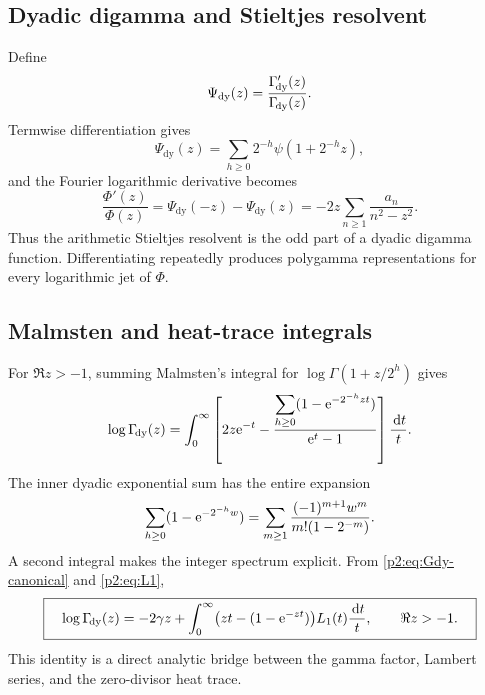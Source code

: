 \documentclass[11pt]{article}
\theoremstyle{definition}
\theoremstyle{remark}
\newcommand{\dd}{\,\mathrm d}
\begin{document}
\subsection{Dyadic digamma and Stieltjes resolvent}

Define
\begin{equation}
 \Psi_{\mathrm{dy}}(z)=\frac{\Gamma_{\!\mathrm{dy}}'(z)}{\Gamma_{\!\mathrm{dy}}(z)}.
\end{equation}
Termwise differentiation gives
\begin{equation}
 \Psi_{\mathrm{dy}}(z)=\sum_{h\ge0}2^{-h}\psi(1+2^{-h}z),                 \label{p2:eq:dyadic-digamma}
\end{equation}
and the Fourier logarithmic derivative becomes
\begin{equation}
 \boxed{\quad
 \frac{\Phi'(z)}{\Phi(z)}
 =\Psi_{\mathrm{dy}}(-z)-\Psi_{\mathrm{dy}}(z)
 =-2z\sum_{n\ge1}\frac{a_n}{n^2-z^2}.
 \quad}                                                  \label{p2:eq:digamma-resolvent}
\end{equation}
Thus the arithmetic Stieltjes resolvent is the odd part of a dyadic digamma function.
Differentiating repeatedly produces polygamma representations for every logarithmic jet of
$\Phi$.

\subsection{Malmsten and heat-trace integrals}

For $\Re z>-1$, summing Malmsten's integral for $\log\Gamma(1+z/2^h)$ gives
\begin{equation}
 \log\GammaDy(z)=\int_0^\infty
 \left[
 2z\e^{-t}-\frac{\displaystyle\sum_{h\ge0}
 (1-\e^{-2^{-h}zt})}{\e^t-1}
 \right]\frac{\dd t}{t}.                               \label{p2:eq:GammaDy-Malmsten}
\end{equation}
The inner dyadic exponential sum has the entire expansion
\begin{equation}
 \sum_{h\ge0}(1-\mathrm e^{-2^{-h}w})
 =\sum_{m\ge1}\frac{(-1)^{m+1}w^m}{m!(1-2^{-m})}.       \label{p2:eq:dyadic-exponential-sum}
\end{equation}
A second integral makes the integer spectrum explicit.  From
\eqref{p2:eq:Gdy-canonical} and \eqref{p2:eq:L1},
\begin{equation}
 \boxed{\quad
 \log\GammaDy(z)
 =-2\gamma z+\int_0^\infty
 \bigl(zt-(1-\e^{-zt})\bigr)L_1(t)\frac{\dd t}{t},
 \qquad \Re z>-1.
 \quad}                                                  \label{p2:eq:GammaDy-heat-integral}
\end{equation}
This identity is a direct analytic bridge between the gamma factor, Lambert series, and the
zero-divisor heat trace.
\end{document}
